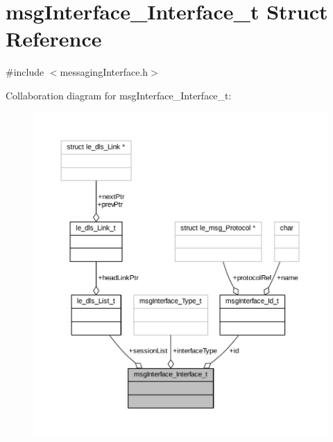 \hypertarget{structmsg_interface___interface__t}{}\section{msg\+Interface\+\_\+\+Interface\+\_\+t Struct Reference}
\label{structmsg_interface___interface__t}


{\ttfamily \#include $<$messaging\+Interface.\+h$>$}



Collaboration diagram for msg\+Interface\+\_\+\+Interface\+\_\+t\+:
\nopagebreak
\begin{figure}[H]
\begin{center}
\leavevmode
\includegraphics[width=350pt]{structmsg_interface___interface__t__coll__graph}
\end{center}
\end{figure}
